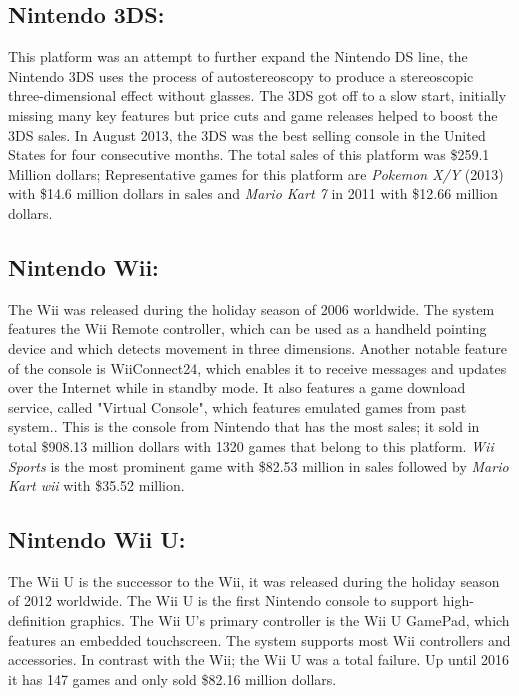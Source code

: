 \subsection{Nintendo 3DS:} This platform was an attempt to further expand the
Nintendo DS line, the Nintendo 3DS uses the process of autostereoscopy to
produce a stereoscopic three-dimensional effect without glasses. The 3DS got
off to a slow start, initially missing many key features but price cuts and
game releases helped to boost the 3DS sales. In August 2013, the 3DS was the
best selling console in the United States for four consecutive
months. The total sales of this platform was \$259.1 Million dollars;
Representative games for this platform are \textit{Pokemon X/Y} (2013) with
\$14.6 million dollars in sales and \textit{Mario Kart 7} in 2011 with
\$12.66 million dollars.\\


\subsection{Nintendo Wii:} The Wii was released during the holiday season of
2006 worldwide. The system features the Wii Remote controller, which can be
used as a handheld pointing device and which detects movement in three
dimensions. Another notable feature of the console is WiiConnect24, which
enables it to receive messages and updates over the Internet while in standby
mode. It also features a game download service, called "Virtual Console",
which features emulated games from past system.\cite{Nintendo}. This is the
console from Nintendo that has the most sales; it sold in total \$908.13
million dollars with 1320 games that belong to this platform. \textit{Wii Sports} is
the most prominent game with \$82.53 million in sales followed by \textit{Mario
  Kart wii} with \$35.52 million.\\

\subsection{Nintendo Wii U:} The Wii U is the successor to the Wii, it was
released during the holiday season of 2012 worldwide. The Wii U is
the first Nintendo console to support high-definition graphics. The Wii U's
primary controller is the Wii U GamePad, which features an embedded
touchscreen. The system supports most Wii controllers and
accessories\cite{Nintendo}. In contrast with the Wii; the Wii U was a total
failure. Up until 2016 it has 147 games and only sold \$82.16 million dollars.\newpage

